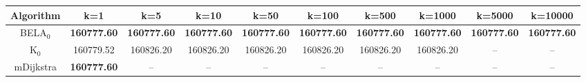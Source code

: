 \begin{tabular}{c|ccccccccc}\toprule
Algorithm & k=1 & k=5 & k=10 & k=50 & k=100 & k=500 & k=1000 & k=5000 & k=10000 \\ \midrule
BELA$_0$ & \textbf{160777.60} & \textbf{160777.60} & \textbf{160777.60} & \textbf{160777.60} & \textbf{160777.60} & \textbf{160777.60} & \textbf{160777.60} & \textbf{160777.60} & \textbf{160777.60} \\
K$_0$ & 160779.52 & 160826.20 & 160826.20 & 160826.20 & 160826.20 & 160826.20 & 160826.20 & -- & -- \\
mDijkstra & \textbf{160777.60} & -- & -- & -- & -- & -- & -- & -- & -- \\ \bottomrule 
\end{tabular}

